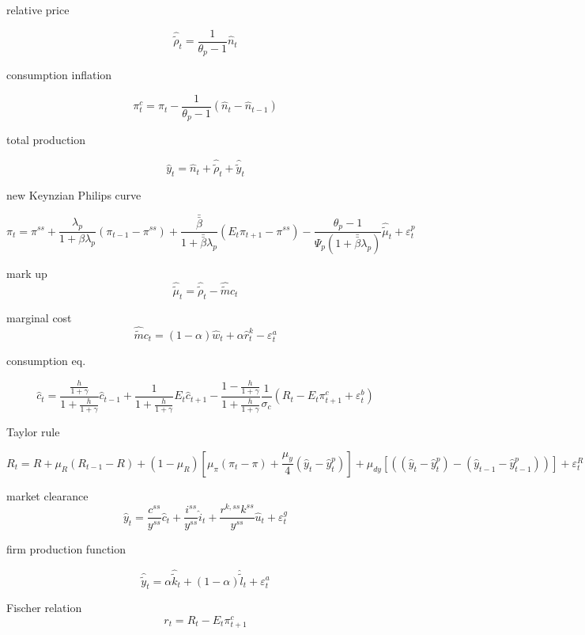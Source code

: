 \documentclass[11pt]{article}
\begin{document}
relative price

\[
{\hat \tilde \rho _t} = \frac{1}{{{\theta _p} - 1}}{\hat n_t}
\]

consumption inflation

\[
\pi _t^c = {\pi _t} - \frac{1}{{{\theta _p} - 1}}({\hat n_t} - {\hat n_{t - 1}})
\]


total production

\[
{\hat y_t} = {\hat n_t} + {\hat \tilde \rho _t} + {\hat \tilde y_t}
\]


new Keynzian Philips curve

\[
{\pi _t} = {\pi ^{ss}} + \frac{{{\lambda _p}}}{{1 + \beta {\lambda _p}}}({\pi
_{t - 1}} - {\pi ^{ss}}) + \frac{{\bar \bar \beta }}{{1 + \bar \bar \beta
{\lambda _p}}}({E_t}{\pi _{t + 1}} - {\pi ^{ss}}) - \frac{{{\theta _p} -
1}}{{{\Psi _p}(1 + \bar \bar \beta {\lambda _p})}}{\hat \tilde \mu _t} +
\varepsilon _t^p
\]


mark up
\[
{\hat \tilde \mu _t} = {\hat \tilde \rho _t} - \hat \tilde m{c_t}
\]

marginal cost
\[
\hat \tilde m{c_t} = (1 - \alpha ){\hat w_t} + \alpha \hat r_t^k - \varepsilon
_t^a
\]

consumption eq.

\[
{\hat c_t} = \frac{{\frac{h}{{1 + \gamma }}}}{{1 + \frac{h}{{1 + \gamma
}}}}{\hat c_{t - 1}} + \frac{1}{{1 + \frac{h}{{1 + \gamma }}}}{E_t}{\hat c_{t +
1}} - \frac{{1 - \frac{h}{{1 + \gamma }}}}{{1 + \frac{h}{{1 + \gamma
}}}}\frac{1}{{{\sigma _c}}}\left( {{R_t} - {E_t}\pi _{t + 1}^c + \varepsilon
_t^b} \right)
\]


Taylor rule

\[
{R_t} = R + {\mu _R}({R_{t - 1}} - R) + (1 - {\mu _R})\left[ {{\mu _\pi }\left(
{{\pi _t} - \pi } \right) + \frac{{{\mu _y}}}{4}\left( {{{\hat y}_t} - \hat
y_t^p} \right)} \right] + {\mu _{dy}}\left[ {\left( {\left( {{{\hat y}_t} - \hat
y_t^p} \right) - \left( {{{\hat y}_{t - 1}} - \hat y_{t - 1}^p} \right)} \right)}
\right] + \varepsilon _t^R
\]

market clearance
\[
{\hat y_t} = \frac{{{c^{ss}}}}{{{y^{ss}}}}{\hat c_t} +
\frac{{{i^{ss}}}}{{{y^{ss}}}}{\hat i_t} +
\frac{{{r^{k,ss}}{k^{ss}}}}{{{y^{ss}}}}{\hat u_t} + \varepsilon _t^g
\]


firm production function

\[
{\hat \tilde y_t} = \alpha {\hat \tilde k_t} + (1 - \alpha ){\hat \tilde l_t} +
\varepsilon _t^a
\]


Fischer relation
\[
{r_t} = {R_t} - {E_t}\pi _{t + 1}^c
\]
\end{document}
